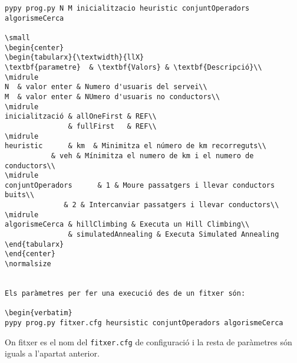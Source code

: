 \begin{verbatim}
pypy prog.py N M inicialitzacio heuristic conjuntOperadors algorismeCerca

\small
\begin{center}
\begin{tabularx}{\textwidth}{llX}
\textbf{parametre}  & \textbf{Valors} & \textbf{Descripció}\\
\midrule
N  & valor enter & Numero d'usuaris del servei\\
M  & valor enter & NUmero d'usuaris no conductors\\
\midrule
inicialització & allOneFirst & REF\\
               & fullFirst   & REF\\
\midrule
heuristic      & km  & Minimitza el número de km recorreguts\\
	       & veh & Mínimitza el numero de km i el numero de conductors\\
\midrule
conjuntOperadors      & 1 & Moure passatgers i llevar conductors buits\\
		      & 2 & Intercanviar passatgers i llevar conductors\\
\midrule
algorismeCerca & hillClimbing & Executa un Hill Climbing\\
               & simulatedAnnealing & Executa Simulated Annealing
\end{tabularx}
\end{center}
\normalsize


Els paràmetres per fer una execució des de un fitxer són:

\begin{verbatim}
pypy prog.py fitxer.cfg heursistic conjuntOperadors algorismeCerca
\end{verbatim}

On fitxer es el nom del \texttt{fitxer.cfg} de configuració i la resta de paràmetres són
iguals a l'apartat anterior.


